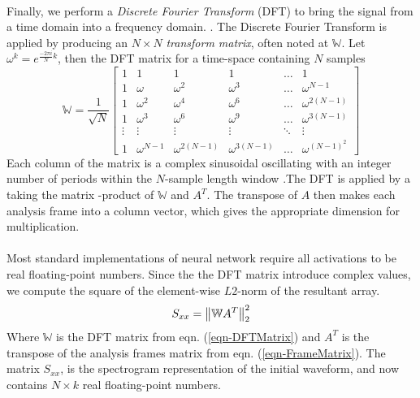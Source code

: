 \documentclass[12pt,letterpaper]{article}
\begin{document}
\paragraph*{}Finally, we perform a \textit{Discrete Fourier Transform} (DFT) to bring the signal from a time domain into a frequency domain. \cite{Olson,Peatross}. The Discrete Fourier Transform is applied by producing an $N \times N$ \textit{transform matrix}, often noted at $\mathbb{W}$. Let $\omega^k = e^{\frac{-2\pi i}{N}k}$, then the DFT matrix for a time-space containing $N$ samples
\begin{equation}
\label{eqn-DFTMatrix}
\mathbb{W} = \frac{1}{\sqrt{N}}
\begin{bmatrix}
1 & 1 & 1 & 1 & \hdots & 1 \\
1 & \omega		& \omega^2 & \omega^3 & \hdots & \omega^{N-1} \\
1 & \omega^2	& \omega^4 & \omega^6 & \hdots & \omega^{2(N-1)} \\
1 & \omega^3	& \omega^6 & \omega^9 & \hdots & \omega^{3(N-1)} \\
\vdots & \vdots & \vdots & \vdots & \ddots & \vdots \\
1 & \omega^{N-1} & \omega^{2(N-1)} & \omega^{3(N-1)} & \hdots & \omega^{(N-1)^2}
\end{bmatrix}
\end{equation}
Each column of the matrix is a complex sinusoidal oscillating with an integer number of periods within the $N$-sample length window \cite{Short,Peatross}.The DFT is applied by a taking the matrix -product of $\mathbb{W}$ and $A^T$. The transpose of $A$ then makes each analysis frame into a column vector, which gives the appropriate dimension for multiplication.

\paragraph*{}Most standard implementations of neural network require all activations to be real floating-point numbers. Since the the DFT matrix introduce complex values, we compute the square of the element-wise $L2$-norm of the resultant array.
\begin{equation}
\label{eqn-Spectrogram}
S_{xx} = \big{\lVert} \mathbb{W}A^T \big{\rVert}_{2}^{2}
\end{equation}
Where $\mathbb{W}$ is the DFT matrix from eqn. (\ref{eqn-DFTMatrix}) and $A^T$ is the transpose of the analysis frames matrix from eqn. (\ref{eqn-FrameMatrix}). The matrix $S_{xx}$, is the spectrogram representation of the initial waveform, and now contains $N \times k$ real floating-point numbers.
\end{document}
